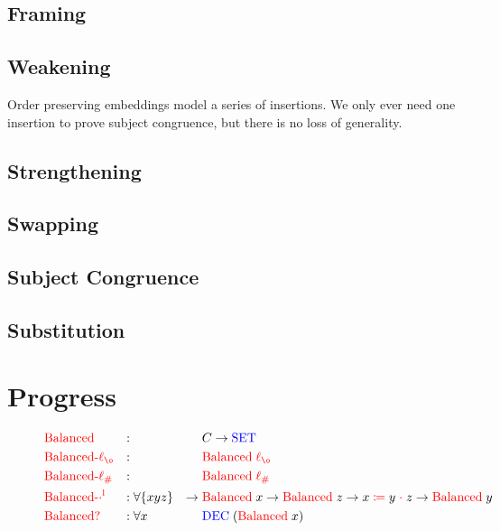 \documentclass[a4paper,UKenglish,cleveref, autoref, thm-restate,authorcolumns]{lipics-v2019}
\newcommand{\type}[1]{\textcolor{blue}{\mathtt{\operatorname{#1}}}}
\newcommand{\field}[1]{\textcolor{red}{\mathtt{\operatorname{#1}}}}
\newcommand{\op}[3]{#1 \; \field{\coloneqq} \; #2 \; \field{\cdot} \; #3}
\newcommand{\lz}{\field{\ell_{\o}}}
\newcommand{\lio}{\field{\ell_{\#}}}
\newcommand{\Balanced}{\field{Balanced}}
\newcommand{\Set}{\type{SET}}
\begin{document}
\subsection{Framing}


\subsection{Weakening}

Order preserving embeddings model a series of insertions. We only ever need one insertion to prove subject congruence, but there is no loss of generality.

\subsection{Strengthening}

\subsection{Swapping}

\subsection{Subject Congruence}\label{subject-congruence}

\subsection{Substitution}

\section{Progress}\label{progress}

\begin{figure}[h]
\begin{equation}
\begin{aligned}
  &\Balanced                &:{} &                      &        & C \to \Set \\
  &\field{Balanced-}\lz     &:{} &                      &        & \Balanced \; \lz \\
  &\field{Balanced-}\lio    &:{} &                      &        & \Balanced \; \lio \\
  &\field{Balanced-\cdot^l} &:{} &\forall \{x y z\}     & \to \; & \Balanced \; x \to \Balanced \; z \to \op{x}{y}{z} \to \Balanced \; y \\
  &\field{Balanced?}        &:{} &\forall x             &        & \type{DEC} \; (\field{Balanced} \; x)
\end{aligned}
\end{equation}
\caption{}
\label{progress-capabilities}
\end{figure}
\end{document}

